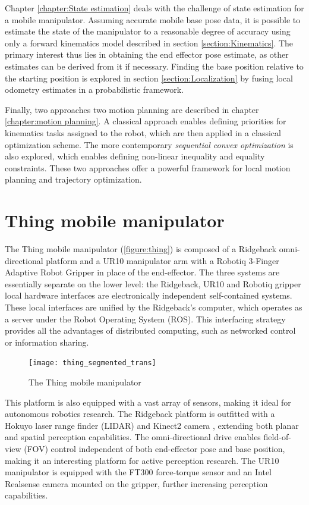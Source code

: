 \documentclass[times, utf8, diplomski, english]{fer}
\begin{document}
Chapter \ref{chapter:State estimation} deals with the challenge of state estimation for a mobile manipulator.
Assuming accurate mobile base pose data, it is possible to estimate the state of the manipulator to a reasonable degree of accuracy using only a forward kinematics model described in section \autoref{section:Kinematics}.
The primary interest thus lies in obtaining the end effector pose estimate, as other estimates can be derived from it if necessary.
Finding the base position relative to the starting position is explored in section \autoref{section:Localization} by fusing local odometry estimates in a probabilistic framework.

Finally, two approaches two motion planning are described in chapter \autoref{chapter:motion planning}.
A classical approach enables defining priorities for kinematics tasks assigned to the robot, which are then applied in a classical optimization scheme.
The more contemporary \textit{sequential convex optimization} is also explored, which enables defining non-linear inequality and equality constraints. 
These two approaches offer a powerful framework for local motion planning and trajectory optimization.


\chapter{Thing mobile manipulator}\label{chapter:thing}
The Thing mobile manipulator (\autoref{figure:thing}) is composed of a Ridgeback omni-directional platform and a UR10 manipulator arm with a Robotiq 3-Finger Adaptive Robot Gripper in place of the end-effector.
The three systems are essentially separate on the lower level: the Ridgeback, UR10 and Robotiq gripper local hardware interfaces are electronically independent self-contained systems.
These local interfaces are unified by the Ridgeback's computer, which operates as a server under the Robot Operating System (ROS).
This interfacing strategy provides all the advantages of distributed computing, such as networked control or information sharing.
\begin{figure}[h]
\centering
\texttt{[image: thing\_segmented\_trans]}
\caption{The Thing mobile manipulator}
\label{figure:thing}
\end{figure}
This platform is also equipped with a vast array of sensors, making it ideal for autonomous robotics research.
The Ridgeback platform is outfitted with a Hokuyo laser range finder (LIDAR) and Kinect2 camera , extending both planar and spatial perception capabilities.
The omni-directional drive enables field-of-view (FOV) control independent of both end-effector pose and base position, making it an interesting platform for active perception research.
The UR10 manipulator is equipped with the FT300 force-torque sensor and an Intel Realsense camera mounted on the gripper, further increasing perception capabilities.
\end{document}
